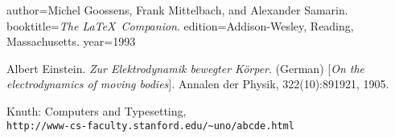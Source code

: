 \begin{thebibliography}{9}
author={Michel Goossens, Frank Mittelbach, and Alexander Samarin.} 
booktitle={\textit{The \LaTeX\ Companion}.} 
edition={Addison-Wesley, Reading, Massachusetts.}
year={1993} 
 
Albert Einstein. 
\textit{Zur Elektrodynamik bewegter K{\"o}rper}. (German) 
[\textit{On the electrodynamics of moving bodies}]. 
Annalen der Physik, 322(10):891921, 1905.
 
Knuth: Computers and Typesetting,
\\\texttt{http://www-cs-faculty.stanford.edu/\~{}uno/abcde.html}
\end{thebibliography}